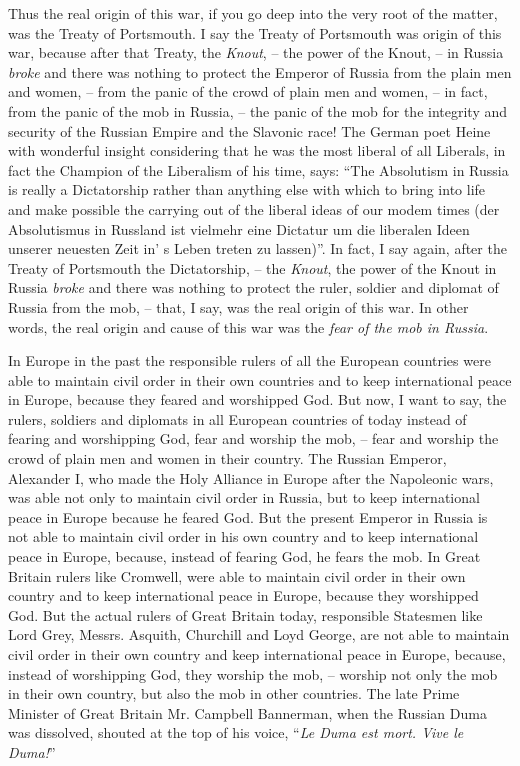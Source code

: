 Thus the real origin of this war,
if you go deep into the very root of the matter, was the Treaty of Portsmouth.
I say the Treaty of Portsmouth was origin of this war,
because after that Treaty, the \emph{Knout},
-- the power of the Knout,
-- in Russia \emph{broke} and there was nothing to protect the Emperor of Russia from the plain men and women,
-- from the panic of the crowd of plain men and women,
-- in fact, from the panic of the mob in Russia,
-- the panic of the mob for the integrity and security of the Russian Empire and the Slavonic race!
The German poet Heine with wonderful insight considering that he was the most liberal of all Liberals,
in fact the Champion of the Liberalism of his time, says:
``The Absolutism in Russia is really a Dictatorship rather than anything else with which to bring into life and make possible the carrying out of the liberal ideas of our modem times 
(der Absolutismus in Russland ist vielmehr eine Dictatur um die liberalen Ideen unserer neuesten Zeit in' s Leben treten zu lassen)''.
In fact, I say again, after the Treaty of Portsmouth the Dictatorship,
-- the \emph{Knout},
the power of the Knout in Russia \emph{broke} and there was nothing to protect the ruler,
soldier and diplomat of Russia from the mob,
-- that, I say, was the real origin of this war.
In other words, the real origin and cause of this war was the \emph{fear of the mob in Russia}.

In Europe in the past the responsible rulers of all the European countries 
were able to maintain civil order in their own countries and to keep international peace in Europe,
because they feared and worshipped God.
But now, I want to say, the rulers, soldiers and diplomats in all European countries of today instead of fearing and worshipping God, fear and worship the mob,
-- fear and worship the crowd of plain men and women in their country.
The Russian Emperor, Alexander I, who made the Holy Alliance in Europe after the Napoleonic wars,
was able not only to maintain civil order in Russia, but to keep international peace in Europe because he feared God.
But the present Emperor in Russia is not able to maintain civil order in his own country and to keep international peace in Europe, because, instead of fearing God,
he fears the mob.
In Great Britain rulers like Cromwell, were able to maintain civil order in their own country and to keep international peace in Europe,
because they worshipped God. But the actual rulers of Great Britain today, responsible Statesmen like Lord Grey, Messrs.
Asquith, Churchill and Loyd George,
are not able to maintain civil order in their own country and keep international peace in Europe,
because, instead of worshipping God, they worship the mob,
-- worship not only the mob in their own country,
but also the mob in other countries.
The late Prime Minister of Great Britain Mr. Campbell Bannerman,
when the Russian Duma was dissolved, shouted at the top of his voice,
``\emph{Le Duma est mort. Vive le Duma!}''


